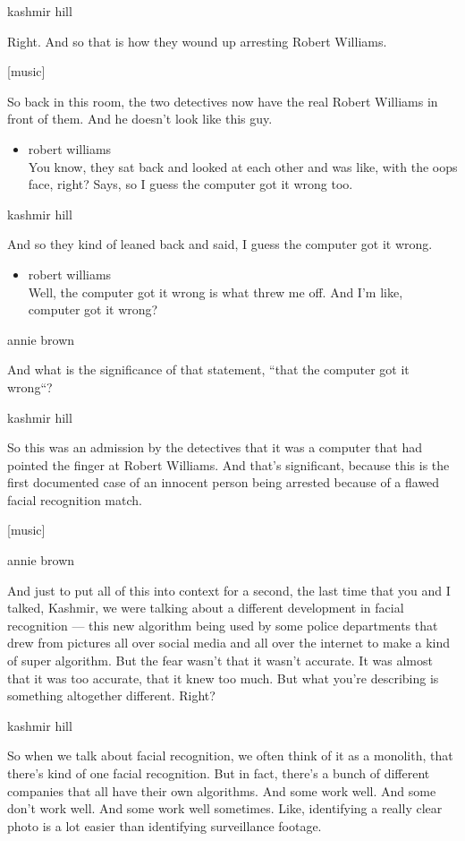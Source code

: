 kashmir hill

Right. And so that is how they wound up arresting Robert Williams.

{[}music{]}

So back in this room, the two detectives now have the real Robert
Williams in front of them. And he doesn't look like this guy.

\begin{itemize}
\tightlist
\item
  robert williams\\
  You know, they sat back and looked at each other and was like, with
  the oops face, right? Says, so I guess the computer got it wrong too.
\end{itemize}

kashmir hill

And so they kind of leaned back and said, I guess the computer got it
wrong.

\begin{itemize}
\tightlist
\item
  robert williams\\
  Well, the computer got it wrong is what threw me off. And I'm like,
  computer got it wrong?
\end{itemize}

annie brown

And what is the significance of that statement, ``that the computer got
it wrong``?

kashmir hill

So this was an admission by the detectives that it was a computer that
had pointed the finger at Robert Williams. And that's significant,
because this is the first documented case of an innocent person being
arrested because of a flawed facial recognition match.

{[}music{]}

annie brown

And just to put all of this into context for a second, the last time
that you and I talked, Kashmir, we were talking about a different
development in facial recognition --- this new algorithm being used by
some police departments that drew from pictures all over social media
and all over the internet to make a kind of super algorithm. But the
fear wasn't that it wasn't accurate. It was almost that it was too
accurate, that it knew too much. But what you're describing is something
altogether different. Right?

kashmir hill

So when we talk about facial recognition, we often think of it as a
monolith, that there's kind of one facial recognition. But in fact,
there's a bunch of different companies that all have their own
algorithms. And some work well. And some don't work well. And some work
well sometimes. Like, identifying a really clear photo is a lot easier
than identifying surveillance footage.

